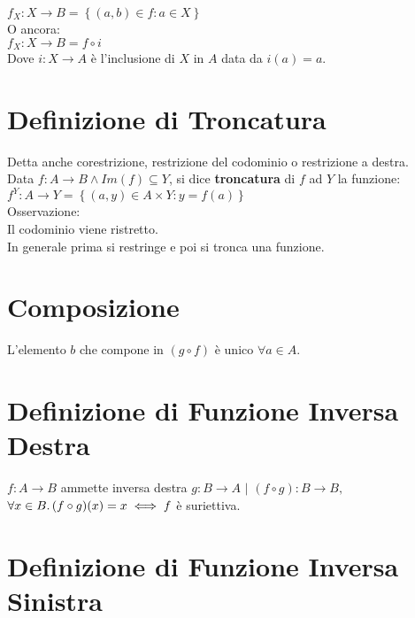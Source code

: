 \documentclass[a4paper, twoside, italian, 11pt]{book}
\newcommand{\braces}[1] {\left\{#1\right\}}
\begin{document}
$f_X : X \rightarrow B = \braces{(a, b) \in f : a \in X}$ \\

\noindent
O ancora: \\

$f_X : X \rightarrow B = f \circ i$ \\

\noindent
Dove $i : X \rightarrow A$ è l'inclusione di $X$ in $A$ data da $i(a) = a$.



\section{Definizione di Troncatura}

Detta anche corestrizione, restrizione del codominio o restrizione a destra. \\

\noindent
Data $f : A \rightarrow B \land Im(f) \subseteq Y$, si dice \textbf{troncatura} di $f$ ad $Y$ la funzione: \\

$f^Y : A \rightarrow Y = \braces{(a, y) \in A \times Y : y = f(a)}$ \\

\noindent
Osservazione: \\
Il codominio viene ristretto.\\

\noindent
In generale prima si restringe e poi si tronca una funzione.



\section{Composizione}

L'elemento $b$ che compone in $(g \circ f)$ è unico $\forall a \in A$.



\section{Definizione di Funzione Inversa Destra}

$f : A \rightarrow B$ ammette inversa destra $g : B \rightarrow A$ $|$ $(f \circ g) : B \rightarrow B,$ $\forall x \in B \ldotp (f \circ g)(x) = x \iff f$ è suriettiva.



\section{Definizione di Funzione Inversa Sinistra}
\end{document}
